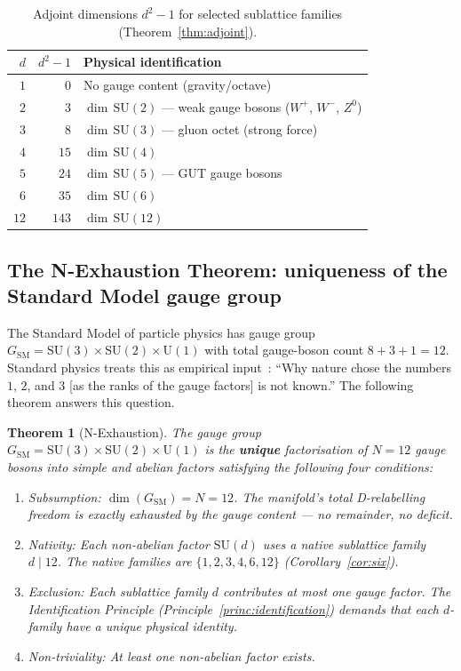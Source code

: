 \documentclass[11pt,a4paper]{article}
\newtheorem{theorem}{Theorem}[section]
\theoremstyle{definition}
\theoremstyle{remark}
\begin{document}
\begin{table}[h]
\centering
\begin{tabular}{@{}r r l@{}}
\toprule
$d$ & $d^{2}-1$ & Physical identification \\
\midrule
$1$ & $0$   & No gauge content (gravity/octave) \\
$2$ & $3$   & $\dim\,\mathrm{SU}(2)$ --- weak gauge bosons ($W^{+}$, $W^{-}$, $Z^{0}$) \\
$3$ & $8$   & $\dim\,\mathrm{SU}(3)$ --- gluon octet (strong force) \\
$4$ & $15$  & $\dim\,\mathrm{SU}(4)$ \\
$5$ & $24$  & $\dim\,\mathrm{SU}(5)$ --- GUT gauge bosons \\
$6$ & $35$  & $\dim\,\mathrm{SU}(6)$ \\
$12$ & $143$ & $\dim\,\mathrm{SU}(12)$ \\
\bottomrule
\end{tabular}
\caption{Adjoint dimensions $d^{2}-1$ for selected sublattice families (Theorem~\ref{thm:adjoint}).}
\label{tab:adjoint-values}
\end{table}

\subsection{The N-Exhaustion Theorem: uniqueness of the Standard Model gauge group}\label{subsec:n-exhaustion}

The Standard Model of particle physics has gauge group $G_{\mathrm{SM}} = \mathrm{SU}(3) \times \mathrm{SU}(2) \times \mathrm{U}(1)$ with total gauge-boson count $8 + 3 + 1 = 12$. Standard physics treats this as empirical input~\cite{Tong}: ``Why nature chose the numbers $1$, $2$, and $3$ [as the ranks of the gauge factors] is not known.'' The following theorem answers this question.

\begin{theorem}[N-Exhaustion]\label{thm:n-exhaustion}
The gauge group $G_{\mathrm{SM}} = \mathrm{SU}(3) \times \mathrm{SU}(2) \times \mathrm{U}(1)$ is the \textbf{unique} factorisation of $N = 12$ gauge bosons into simple and abelian factors satisfying the following four conditions:
\begin{enumerate}[label=\textnormal{(C\arabic*)},leftmargin=*]
\item \emph{Subsumption:} $\dim(G_{\mathrm{SM}}) = N = 12$. The manifold's total D-relabelling freedom is exactly exhausted by the gauge content --- no remainder, no deficit.
\item \emph{Nativity:} Each non-abelian factor $\mathrm{SU}(d)$ uses a native sublattice family $d \mid 12$. The native families are $\{1,2,3,4,6,12\}$ (Corollary~\ref{cor:six}).
\item \emph{Exclusion:} Each sublattice family $d$ contributes at most one gauge factor. The Identification Principle (Principle~\ref{princ:identification}) demands that each $d$-family have a unique physical identity.
\item \emph{Non-triviality:} At least one non-abelian factor exists.
\end{enumerate}
\end{theorem}
\end{document}
